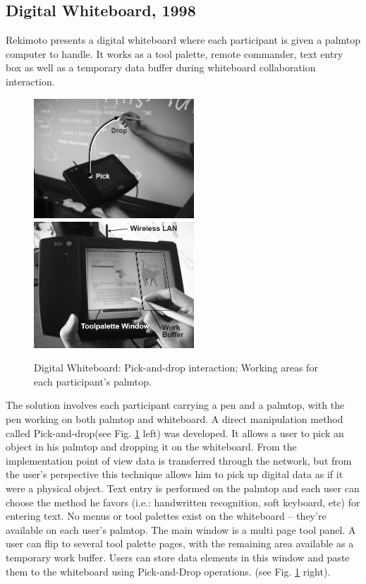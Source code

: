 \subsection{Digital Whiteboard, 1998}

Rekimoto \cite{WBOARD} presents a digital whiteboard where each participant is given
a palmtop computer to handle. It works as a tool palette, remote commander, text entry box as
well as a temporary data buffer during whiteboard collaboration interaction.

\begin{figure}[!ht]
	\centering
	\includegraphics[width=6cm]{gfx/wboard.png}
	\includegraphics[width=6cm]{gfx/wboard2.png}
	\caption{Digital Whiteboard:
		Pick-and-drop interaction;
		Working areas for each participant's palmtop.}
	\label{FIG-WBOARD}
\end{figure}

The solution involves each participant carrying a pen and a palmtop,
with the pen working on both palmtop and whiteboard.
A direct manipulation method called Pick-and-drop(see Fig. \ref{FIG-WBOARD} left) was developed.
It allows a user to pick an object in his palmtop and dropping it on the whiteboard.
From the implementation point of view data is transferred through the network,
but from the user's perspective this technique allows him to pick up digital data
as if it were a physical object.
Text entry is performed on the palmtop and each user can choose the method he favors
(i.e.: handwritten recognition, soft keyboard, etc) for entering text.
No menus or tool palettes exist on the whiteboard -- they're available on each user's palmtop.
The main window is a multi page tool panel.
A user can flip to several tool palette pages, with the remaining area available as a temporary work buffer.
Users can store data elements in this window and paste them to the whiteboard
using Pick-and-Drop operations. (see Fig. \ref{FIG-WBOARD} right).

